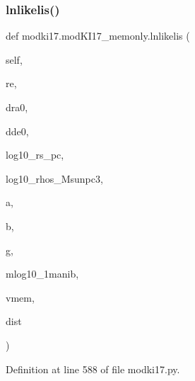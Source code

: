 \subsubsection{\texorpdfstring{lnlikelis()}{lnlikelis()}}
{\footnotesize\ttfamily def modki17.\+mod\+K\+I17\+\_\+memonly.\+lnlikelis (\begin{DoxyParamCaption}\item[{}]{self,  }\item[{}]{re,  }\item[{}]{dra0,  }\item[{}]{dde0,  }\item[{}]{log10\+\_\+rs\+\_\+pc,  }\item[{}]{log10\+\_\+rhos\+\_\+\+Msunpc3,  }\item[{}]{a,  }\item[{}]{b,  }\item[{}]{g,  }\item[{}]{mlog10\+\_\+1manib,  }\item[{}]{vmem,  }\item[{}]{dist }\end{DoxyParamCaption})}



Definition at line 588 of file modki17.\+py.


